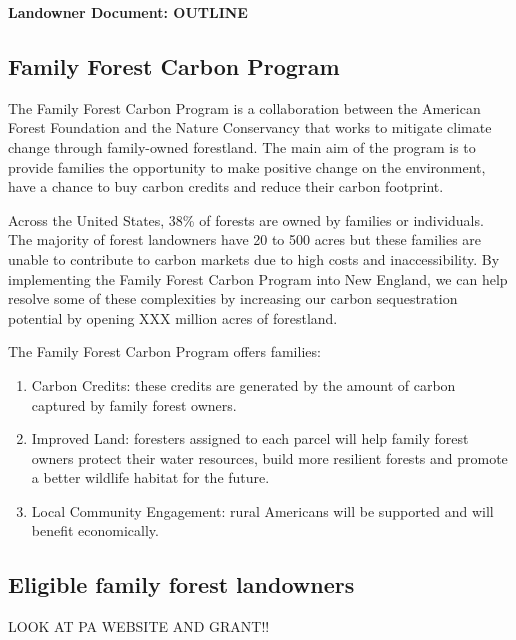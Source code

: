 \documentclass{article}\usepackage[]{graphicx}\usepackage[]{color}
\begin{document}
\noindent \textbf{\Large{Landowner Document: OUTLINE}}

\subsection*{Family Forest Carbon Program}

The Family Forest Carbon Program is a collaboration between the American Forest Foundation and the Nature Conservancy that works to mitigate climate change through family-owned forestland. The main aim of the program is to provide families the opportunity to make positive change on the environment, have a chance to buy carbon credits and reduce their carbon footprint. 

Across the United States, 38\% of forests are owned by families or individuals. The majority of forest landowners have 20 to 500 acres but these families are unable to contribute to carbon markets due to high costs and inaccessibility.  By implementing the Family Forest Carbon Program into New England, we can help resolve some of these complexities by increasing our carbon sequestration potential by opening XXX million acres of forestland. 

The Family Forest Carbon Program offers families: 
\begin{enumerate}
\item Carbon Credits: these credits are generated by the amount of carbon captured by family forest owners.
\item Improved Land: foresters assigned to each parcel will help family forest owners protect their water resources, build more resilient forests and promote a better wildlife habitat for the future.
\item Local Community Engagement: rural Americans will be supported and will benefit economically.
\end{enumerate}

\subsection*{Eligible family forest landowners}
LOOK AT PA WEBSITE AND GRANT!!
\end{document}
